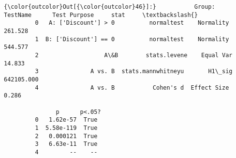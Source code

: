 \documentclass[11pt]{article}
\begin{document}
\begin{Verbatim}[commandchars=\\\{\}]
{\color{outcolor}Out[{\color{outcolor}46}]:}           Group:              TestName      Test Purpose     stat     \textbackslash{}
         0   A: ['Discount'] > 0          normaltest    Normality     261.528   
         1  B: ['Discount'] == 0          normaltest    Normality     544.577   
         2                   A\&B        stats.levene    Equal Var      14.833   
         3               A vs. B  stats.mannwhitneyu       H1\_sig  642105.000   
         4               A vs. B           Cohen's d  Effect Size       0.286   
         
               p      p<.05?  
         0   1.62e-57  True   
         1  5.58e-119  True   
         2   0.000121  True   
         3   6.63e-11  True   
         4         --    --   
\end{Verbatim}
            
\end{document}

